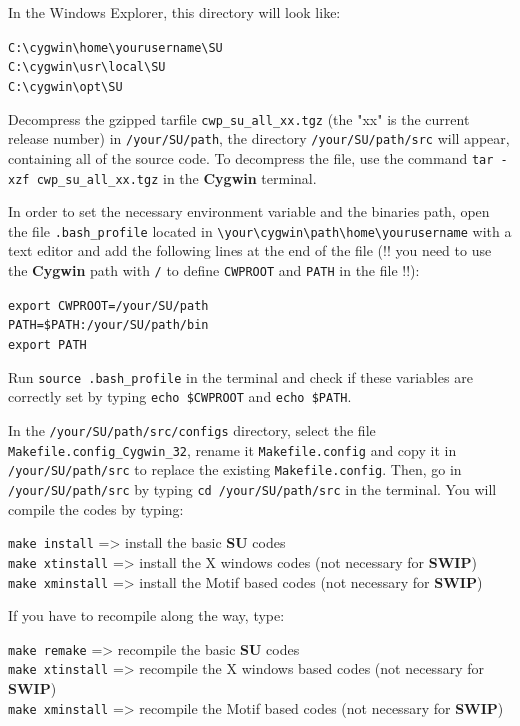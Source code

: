 \documentclass[twoside,a4paper]{article}
\def\SWIP{\textbf{SWIP}}
\def\SU{\textbf{SU}}
\def\Cygwin{\textbf{Cygwin}}
\begin{document}
In the Windows Explorer, this directory will look like:

\verb|C:\cygwin\home\yourusername\SU|\\
\verb|C:\cygwin\usr\local\SU|\\
\verb|C:\cygwin\opt\SU|

Decompress the gzipped tarfile \verb|cwp_su_all_xx.tgz| (the "xx" is the current release number) in \verb|/your/SU/path|, the directory \verb|/your/SU/path/src| will appear, containing all of the source code. To decompress the file, use the command \verb|tar -xzf cwp_su_all_xx.tgz| in the {\Cygwin} terminal.

In order to set the necessary environment variable and the binaries path, open the file \verb|.bash_profile| located in \verb|\your\cygwin\path\home\yourusername| with a text editor and add the following lines at the end of the file (!! you need to use the {\Cygwin} path with \verb|/| to define \verb|CWPROOT| and \verb|PATH| in the file !!):

\verb|export CWPROOT=/your/SU/path|\\
\verb|PATH=$PATH:/your/SU/path/bin|\\
\verb|export PATH|

Run \verb|source .bash_profile| in the terminal and check if these variables are correctly set by typing \verb|echo $CWPROOT| and \verb|echo $PATH|.

In the \verb|/your/SU/path/src/configs| directory, select the file \verb|Makefile.config_Cygwin_32|, rename it \verb|Makefile.config| and copy it in \verb|/your/SU/path/src| to replace the existing \verb|Makefile.config|. Then, go in \verb|/your/SU/path/src| by typing \verb|cd /your/SU/path/src| in the terminal. You will compile the codes by typing:

\verb|make install| => install the basic {\SU} codes\\
\verb|make xtinstall| => install the X windows codes (not necessary for {\SWIP})\\
\verb|make xminstall| => install the Motif based codes (not necessary for {\SWIP})

If you have to recompile along the way, type:

\verb|make remake| => recompile the basic {\SU} codes\\
\verb|make xtinstall| => recompile the X windows based codes (not necessary for {\SWIP})\\
\verb|make xminstall| => recompile the Motif based codes (not necessary for {\SWIP})
\end{document}
